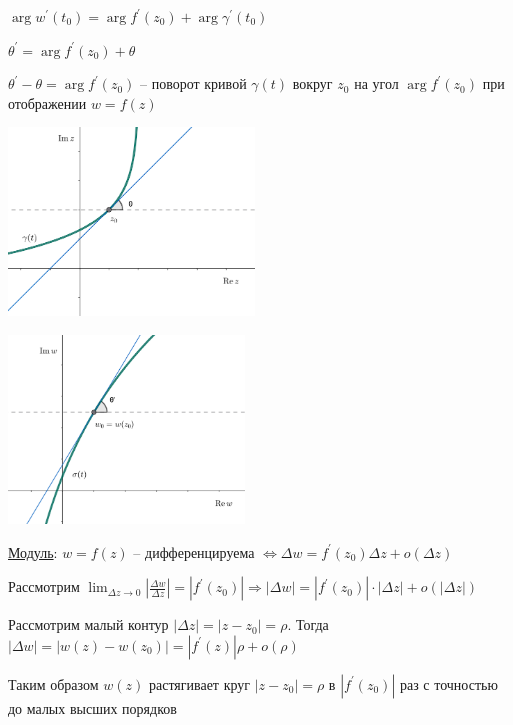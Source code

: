 \documentclass[12pt]{article}
\begin{document}
$\arg w^\prime(t_0) = \arg f^\prime (z_0) + \arg \gamma^\prime(t_0)$

$\theta^\prime = \arg f^\prime(z_0) + \theta$

$\theta^\prime - \theta = \arg f^\prime (z_0)$ -- поворот кривой $\gamma(t)$ вокруг $z_0$ на угол $\arg f^\prime(z_0)$ при отображении $w = f(z)$

\begin{multicols}{2}
    \begin{center}
        \includegraphics[height=5cm]{addchapters2/images/addchapters2_2025_03_21_1}

        \includegraphics[height=5cm]{addchapters2/images/addchapters2_2025_03_21_2}
    \end{center}
\end{multicols}

\mediumvspace

\underline{Модуль}: $w = f(z)$ -- дифференцируема $\Longleftrightarrow \Delta w = f^\prime(z_0) \Delta z + o(\Delta z)$

Рассмотрим $\lim_{\Delta z \to 0} \left|\frac{\Delta w}{\Delta z}\right| = |f^\prime(z_0)| \Longrightarrow |\Delta w| = |f^\prime(z_0)| \cdot |\Delta z| + o(|\Delta z|)$

Рассмотрим малый контур $|\Delta z| = |z - z_0| = \rho$. Тогда $|\Delta w| = |w(z) - w(z_0)| = |f^\prime(z)| \rho + o(\rho)$

Таким образом $w(z)$ растягивает круг $|z - z_0| = \rho$ в $|f^\prime(z_0)|$ раз с точностью до малых высших порядков
\end{document}
